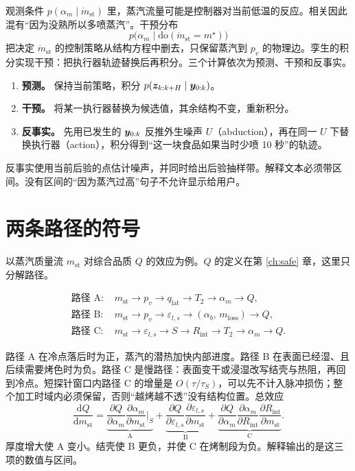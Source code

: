 观测条件 $p(\alpha_m\mid \dot m_{\mathrm{st}})$ 里，蒸汽流量可能是控制器对当前低温的反应。相关因此混有“因为没熟所以多喷蒸汽”。干预分布
\begin{equation}
p\big(\alpha_m\mid\mathrm{do}(\dot m_{\mathrm{st}}=m^\star)\big)
\end{equation}
把决定 $\dot m_{\mathrm{st}}$ 的控制策略从结构方程中删去，只保留蒸汽到 $p_v$ 的物理边。孪生的积分实现干预：把执行器轨迹替换后再积分。三个计算依次为预测、干预和反事实。

\begin{enumerate}
\item \textbf{预测。} 保持当前策略，积分 $p(\bm{z}_{k:k+H}\mid\bm{y}_{0:k})$。
\item \textbf{干预。} 将某一执行器替换为候选值，其余结构不变，重新积分。
\item \textbf{反事实。} 先用已发生的 $\bm{y}_{0:k}$ 反推外生噪声 $U$（abduction），再在同一 $U$ 下替换执行器（action），积分得到“这一块食品如果当时少喷 10 秒”的轨迹。
\end{enumerate}

反事实使用当前后验的点估计噪声，并同时给出后验抽样带。解释文本必须带区间。没有区间的“因为蒸汽过高”句子不允许显示给用户。

\section{两条路径的符号}

以蒸汽质量流 $m_{\mathrm{st}}$ 对综合品质 $Q$ 的效应为例。$Q$ 的定义在第 \ref{ch:safe} 章，这里只分解路径。

\begin{align}
\text{路径 A: }& m_{\mathrm{st}}\to p_v\to q_{\mathrm{lat}}\to T_2\to\alpha_m\to Q,\\
\text{路径 B: }& m_{\mathrm{st}}\to p_v\to\varepsilon_{l,s}\to(\alpha_b,\,m_{\mathrm{loss}})\to Q,\\
\text{路径 C: }& m_{\mathrm{st}}\to\varepsilon_{l,s}\to S\to R_{\mathrm{int}}\to T_2\to\alpha_m\to Q.
\end{align}

路径 A 在冷点落后时为正，蒸汽的潜热加快内部进度。路径 B 在表面已经湿、且后续需要烤色时为负。路径 C 是慢路径：表面变干或浸湿改写结壳与热阻，再回到冷点。短探针窗口内路径 C 的增量是 $O(\tau/\tau_S)$，可以先不计入脉冲损伤；整个加工时域内必须保留，否则“越烤越不透”没有结构位置。总效应
\begin{equation}
\label{eq:path}
\frac{\mathrm{d}Q}{\mathrm{d}m_{\mathrm{st}}}
=\underbrace{\frac{\partial Q}{\partial\alpha_m}\frac{\partial\alpha_m}{\partial m_{\mathrm{st}}}\Big|_{\!S}}_{\text{A}}
+\underbrace{\frac{\partial Q}{\partial\varepsilon_{l,s}}\frac{\partial\varepsilon_{l,s}}{\partial m_{\mathrm{st}}}}_{\text{B}}
+\underbrace{\frac{\partial Q}{\partial\alpha_m}\frac{\partial\alpha_m}{\partial R_{\mathrm{int}}}\frac{\partial R_{\mathrm{int}}}{\partial m_{\mathrm{st}}}}_{\text{C}}.
\end{equation}
厚度增大使 A 变小。结壳使 B 更负，并使 C 在烤制段为负。解释输出的是这三项的数值与区间。

